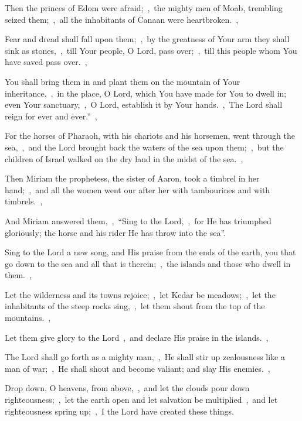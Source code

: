 \documentclass[12pt,twoside,a5paper]{article}
\begin{document}
\begin{halfparskip}
  Then the princes of Edom were afraid;~\sep\ the mighty men of Moab, trembling seized them;~\sep\ all the inhabitants of Canaan were heartbroken.~\sep

  Fear and dread shall fall upon them;~\sep\ by the greatness of Your arm they shall sink as stones,~\sep\ till Your people, O Lord, pass over;~\sep\ till this people whom You have saved pass over.~\sep

  You shall bring them in and plant them on the mountain of Your inheritance,~\sep\ in the place, O Lord, which You have made for You to dwell in; even Your sanctuary,~\sep\ O Lord, establish it by Your hands.~\sep\ The Lord shall reign for ever and ever.''~\sep

  For the horses of Pharaoh, with his chariots and his horsemen, went through the sea,~\sep\ and the Lord brought back the waters of the sea upon them;~\sep\ but the children of Israel walked on the dry land in the midst of the sea.~\sep

  Then Miriam the prophetess, the sister of Aaron, took a timbrel in her hand;~\sep\ and all the women went our after her with tambourines and with timbrels.~\sep

  And Miriam answered them,~\sep\ ``Sing to the Lord,~\sep\ for He has triumphed gloriously; the horse and his rider He has throw into the sea''.
\end{halfparskip}

\begin{halfparskip}
   Sing to the Lord a new song, and His praise from the ends of the earth, you that go down to the sea and all that is therein;~\sep\ the islands and those who dwell in them.~\sep

  Let the wilderness and its towns rejoice;~\sep\ let Kedar be meadows;~\sep\ let the inhabitants of the steep rocks sing,~\sep\ let them shout from the top of the mountains.~\sep

  Let them give glory to the Lord~\sep\ and declare His praise in the islands.~\sep

  The Lord shall go forth as a mighty man,~\sep\ He shall stir up zealousness like a man of war;~\sep\ He shall shout and become valiant; and slay His enemies.~\sep

  Drop down, O heavens, from above,~\sep\ and let the clouds pour down righteousness;~\sep\ let the earth open and let salvation be multiplied~\sep\ and let righteousness spring up;~\sep\ I the Lord have created these things.
\end{halfparskip}
\end{document}
